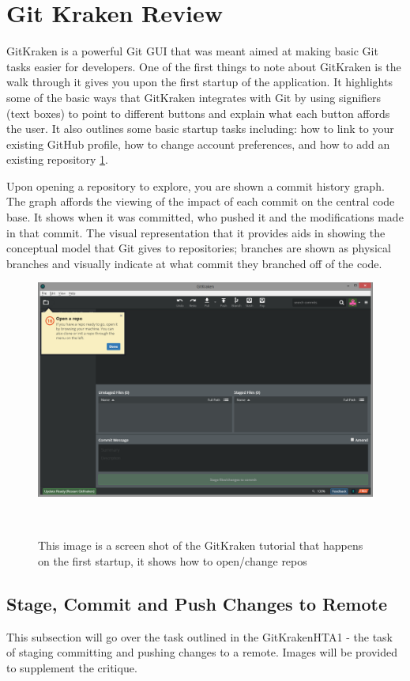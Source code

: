 \documentclass{sigchi}
\begin{document}
\section{Git Kraken Review}
GitKraken is a powerful Git GUI that was meant aimed at making basic Git tasks easier for developers.
One of the first things to note about GitKraken is the walk through it gives you upon the
first startup of the application. It highlights some of the basic ways that GitKraken integrates with Git by
using signifiers (text boxes) to point to different buttons and explain what each button affords the user.
It also outlines some basic startup tasks including: how to link to your existing GitHub profile, how to change
account preferences, and how to add an existing repository \ref{fig:GitKrakenFigure1}.

Upon opening a repository to explore, you are shown a commit history graph. The graph affords the viewing of 
the impact of each commit on the central code base. It shows when it was committed, who pushed it and
the modifications made in that commit. The visual representation that it provides aids in showing the 
conceptual model that Git gives to repositories; branches are shown as physical branches and visually indicate
at what commit they branched off of the code.

\begin{figure}
  \centering
  \includegraphics[width=1.75\columnwidth]{figures/GitKraken/Open_a_repo}
  \caption{This image is a screen shot of the GitKraken tutorial that happens on the first startup, it shows how to open/change repos}~\label{fig:GitKrakenFigure1}
\end{figure}

\subsection{Stage, Commit and Push Changes to Remote}
This subsection will go over the task outlined in the GitKrakenHTA1 - the task of staging committing 
and pushing changes to a remote. Images will be provided to supplement the critique. 
\end{document}

